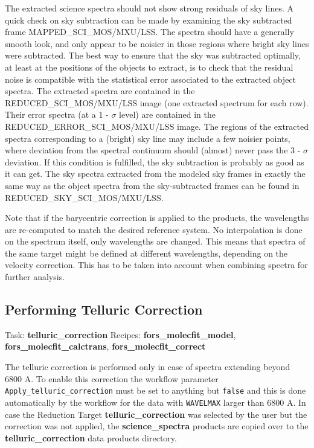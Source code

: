 The extracted science spectra should not show strong residuals of sky lines.
A quick check on sky subtraction can be made by examining the sky subtracted frame MAPPED\_SCI\_MOS/MXU/LSS.
The spectra should have a generally smooth look, and only appear to be noisier in those regions where bright sky lines were subtracted.
The best way to ensure that the sky was subtracted optimally, at least at the positions of the objects
to extract, is to check that the residual noise is compatible with the statistical error associated to the
extracted object spectra. The extracted spectra are contained in the REDUCED\_SCI\_MOS/MXU/LSS image (one extracted spectrum for each row). Their error spectra (at a 1 - $\sigma$ level) are contained in the
REDUCED\_ERROR\_SCI\_MOS/MXU/LSS image. The regions of the extracted spectra corresponding to a (bright) sky line may include a few noisier points, where deviation from the spectral continuum should (almost) never pass the 3 - $\sigma$ deviation. If this condition is fulfilled, the sky subtraction is probably as good as it can get.
The sky spectra extracted from the modeled sky frames in exactly the same way as the object spectra from
the sky-subtracted frames can be found in REDUCED\_SKY\_SCI\_MOS/MXU/LSS.

Note that if the barycentric correction is applied to the products, the wavelengths are re-computed to match the desired reference system. No interpolation is done on the spectrum itself, only wavelengths are changed.
This means that spectra of the same target might be defined at different wavelengths, depending on the velocity correction. This has to be taken into account when combining spectra for further analysis.


\subsection{Performing Telluric Correction}

Task: {\bf telluric\_correction}   Recipes: {\bf fors\_molecfit\_model}, {\bf fors\_molecfit\_calctrans}, {\bf fors\_molecfit\_correct}

The telluric correction is performed only in case of spectra extending beyond 6800 A. To enable this correction the workflow parameter {\tt Apply\_telluric\_correction} must be set to anything but
{\tt false} and this is done automatically by the workflow for the data with {\tt WAVELMAX} larger than 6800 A. In case the Reduction Target {\bf telluric\_correction} was selected by the user but the correction was not applied, the {\bf science\_spectra} products are copied over to the {\bf telluric\_correction} data products directory.

